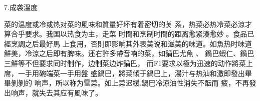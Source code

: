 7.成袭溫度

菜的温度或冷或热对菜的風味和質量好坏有着密切的关 系，热菜必热冷菜必涼才算合乎要求。我国以热食为主，走菜 时間和烹制时間的距离愈紧湊愈妙
。食品已經烹調之后最好馬 上食用，否則即影响其外表美说和滋美的味道。如魚热时味道 鮮美，冷涼之后即有脾味。还右許多帶音响的菜，如鍋巴尤魚
、 鍋巴蝦仁、鍋巴三鮮等不但要求同时制作，边制菜边炸鍋巴， 而F1要求以極为迅速的动作將菜上席，一手用碗端菜一手用盤 盛鍋巴，將菜傾于鍋巴上，湯汁与热汕和激即發出畢畢剝剝的 响声，所以称为雷菜。如上菜迟緩.鍋巴冷涼油性消失不酝而 疲，不再發岀响声，就失去其应有風味了。
